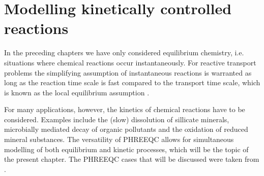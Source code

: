 \section{Modelling kinetically controlled reactions}
\def\shorttitle{Chemical kinetics} %

In the preceding chapters we have only considered equilibrium chemistry, i.e. situations where chemical reactions occur instantaneously. For reactive transport problems the simplifying assumption of instantaneous reactions is warranted as long as the reaction time scale is fast compared to the transport time scale, which is known as the local equilibrium assumption \citep[LEA, e.g.,][]{rubin83}.

For many applications, however, the kinetics of chemical reactions have to be considered. Examples include the (slow) dissolution of sillicate minerals, microbially mediated decay of organic pollutants and the oxidation of reduced mineral substances. The versatility of PHREEQC allows for simultaneous modelling of both equilibrium and kinetic processes, which will be the topic of the present chapter. The PHREEQC cases that will be discussed were taken from \cite{prommer_barry_2005}.
